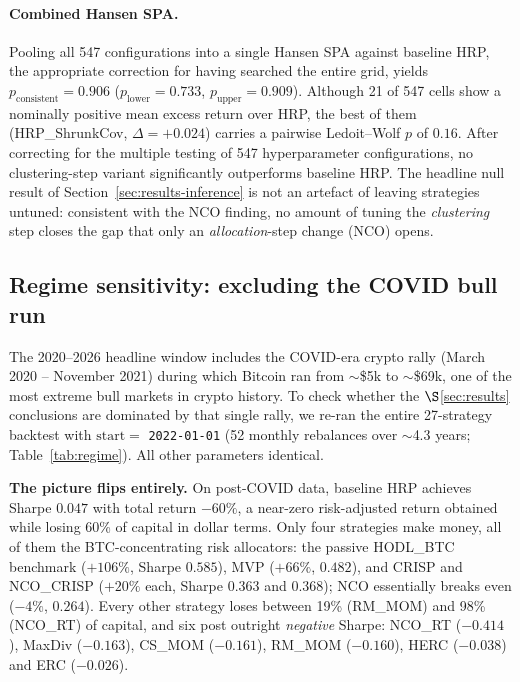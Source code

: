 \documentclass[11pt,a4paper]{article}
\begin{document}
\paragraph{Combined Hansen SPA.} Pooling all 547 configurations into a
single Hansen SPA against baseline HRP, the appropriate correction for
having searched the entire grid, yields $p_{\text{consistent}}=0.906$
($p_{\text{lower}}=0.733$, $p_{\text{upper}}=0.909$). Although 21 of 547
cells show a nominally positive mean excess return over HRP, the best of them
(HRP\_ShrunkCov, $\Delta=+0.024$) carries a pairwise Ledoit--Wolf $p$ of
$0.16$. After correcting for the multiple testing of 547
hyperparameter configurations, no clustering-step variant significantly
outperforms baseline HRP. The headline null result of
Section~\ref{sec:results-inference} is not an artefact of leaving
strategies untuned: consistent with the NCO finding, no amount of
tuning the \emph{clustering} step closes the gap that only an
\emph{allocation}-step change (NCO) opens.

\subsection{Regime sensitivity: excluding the COVID bull run}
\label{sec:results-regime}

The 2020--2026 headline window includes the COVID-era crypto rally
(March 2020 -- November 2021) during which Bitcoin ran from
$\sim$\$5k to $\sim$\$69k, one of the most extreme bull markets
in crypto history. To check whether the $\S$\ref{sec:results}
conclusions are dominated by that single rally, we re-ran the entire
27-strategy backtest with $\mathrm{start}=$ \texttt{2022-01-01}
(52 monthly rebalances over $\sim$4.3 years; Table~\ref{tab:regime}).
All other parameters identical.

\textbf{The picture flips entirely.} On post-COVID data, baseline
HRP achieves Sharpe $0.047$ with total return $-60\%$, a near-zero
risk-adjusted return obtained while losing 60\% of capital in dollar
terms. Only four strategies make money, all of them the BTC-concentrating
risk allocators: the passive HODL\_BTC benchmark ($+106\%$, Sharpe
$0.585$), MVP ($+66\%$, $0.482$), and CRISP and NCO\_CRISP ($+20\%$
each, Sharpe $0.363$ and $0.368$); NCO essentially breaks even
($-4\%$, $0.264$). Every other strategy loses between 19\% (RM\_MOM)
and 98\% (NCO\_RT) of capital, and six post outright \emph{negative}
Sharpe: NCO\_RT ($-0.414$), MaxDiv ($-0.163$), CS\_MOM ($-0.161$),
RM\_MOM ($-0.160$), HERC ($-0.038$) and ERC ($-0.026$).
\end{document}
